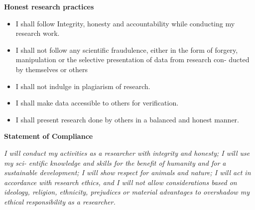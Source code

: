 \documentclass[a4paper,twoside,10pt]{report}
\begin{document}
\textbf{Honest research practices}

\begin{itemize}
	\item I shall follow Integrity, honesty and accountability while conducting my research work.
	
	\item I shall not follow any scientific fraudulence, either in the form of forgery, manipulation or the selective presentation of data from research con- ducted by themselves or others
	
	\item I shall not indulge in plagiarism of research.
	
	\item I shall make data accessible to others for verification.
	
	\item I shall present research done by others in a balanced and honest manner.
	
\end{itemize}

\textbf{Statement of Compliance}

\textit{I will conduct my activities as a researcher with integrity and honesty; I will use my sci- entific knowledge and skills for the benefit of humanity and for a sustainable development; I will show respect for animals and nature; I will act in accordance with research ethics, and I will not allow considerations based on ideology, religion, ethnicity, prejudices or material advantages to overshadow my ethical responsibility as a researcher.}
 




\end{document}
